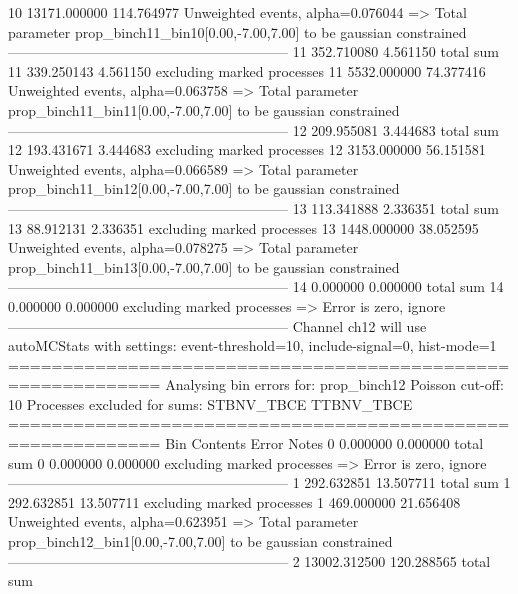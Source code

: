 10         13171.000000    114.764977      Unweighted events, alpha=0.076044
  => Total parameter prop_binch11_bin10[0.00,-7.00,7.00] to be gaussian constrained
------------------------------------------------------------
11         352.710080      4.561150        total sum                     
11         339.250143      4.561150        excluding marked processes    
11         5532.000000     74.377416       Unweighted events, alpha=0.063758
  => Total parameter prop_binch11_bin11[0.00,-7.00,7.00] to be gaussian constrained
------------------------------------------------------------
12         209.955081      3.444683        total sum                     
12         193.431671      3.444683        excluding marked processes    
12         3153.000000     56.151581       Unweighted events, alpha=0.066589
  => Total parameter prop_binch11_bin12[0.00,-7.00,7.00] to be gaussian constrained
------------------------------------------------------------
13         113.341888      2.336351        total sum                     
13         88.912131       2.336351        excluding marked processes    
13         1448.000000     38.052595       Unweighted events, alpha=0.078275
  => Total parameter prop_binch11_bin13[0.00,-7.00,7.00] to be gaussian constrained
------------------------------------------------------------
14         0.000000        0.000000        total sum                     
14         0.000000        0.000000        excluding marked processes    
  => Error is zero, ignore      
------------------------------------------------------------
Channel ch12 will use autoMCStats with settings: event-threshold=10, include-signal=0, hist-mode=1
============================================================
Analysing bin errors for: prop_binch12
Poisson cut-off: 10
Processes excluded for sums: STBNV_TBCE TTBNV_TBCE
============================================================
Bin        Contents        Error           Notes                         
0          0.000000        0.000000        total sum                     
0          0.000000        0.000000        excluding marked processes    
  => Error is zero, ignore      
------------------------------------------------------------
1          292.632851      13.507711       total sum                     
1          292.632851      13.507711       excluding marked processes    
1          469.000000      21.656408       Unweighted events, alpha=0.623951
  => Total parameter prop_binch12_bin1[0.00,-7.00,7.00] to be gaussian constrained
------------------------------------------------------------
2          13002.312500    120.288565      total sum                     
